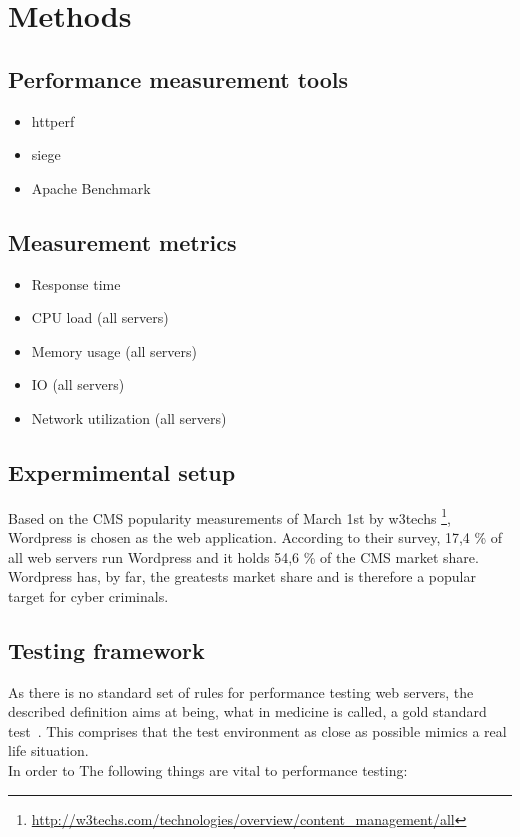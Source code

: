 \documentclass[Methods]{subfiles}
\begin{document}
\section{Methods}
\label{sec:Methods}

\subsection{Performance measurement tools}
\begin{itemize}
\item httperf
\item siege
\item Apache Benchmark
\end{itemize}

\subsection{Measurement metrics}
\begin{itemize}
\item Response time
\item CPU load (all servers)
\item Memory usage (all servers)
\item IO (all servers)
\item Network utilization (all servers)
\end{itemize}

\subsection{Expermimental setup}
Based on the \ac{CMS} popularity measurements of March 1st by w3techs \footnote{\url{http://w3techs.com/technologies/overview/content_management/all}}, Wordpress is chosen as the web application. According to their survey, 17,4 \% of all web servers run Wordpress and it holds 54,6 \% of the CMS market share. Wordpress has, by far, the greatests market share and is therefore a popular target for cyber criminals.

\subsection{Testing framework}
As there is no standard set of rules for performance testing web servers, the described definition aims at being, what in medicine is called, a gold standard test~\cite{wacholder1993validation}. This comprises that the test environment as close as possible mimics a real life situation. \\ 
In order to The following things are vital to performance testing:
\end{document}
